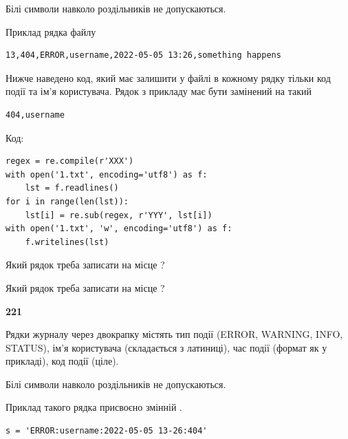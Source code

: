 Білі символи навколо роздільників не допускаються.

Приклад рядка файлу



\begin{verbatim}
13,404,ERROR,username,2022-05-05 13:26,something happens
\end{verbatim}


Нижче наведено код, який має залишити у файлі в кожному рядку тільки код події та ім'я користувача. Рядок з прикладу має бути замінений на такий



\begin{verbatim}
404,username
\end{verbatim}




Код:



\begin{verbatim}
regex = re.compile(r'XXX')
with open('1.txt', encoding='utf8') as f:
    lst = f.readlines()
for i in range(len(lst)):
    lst[i] = re.sub(regex, r'YYY', lst[i])
with open('1.txt', 'w', encoding='utf8') as f:
    f.writelines(lst)
\end{verbatim}







Який рядок треба записати на місце  ?\par
\vspace{5mm}


Який рядок треба записати на місце  ?\par


\newpage

{\begin {center}\textbf{ 221}\end {center}}\par
Рядки журналу через двокрапку містять тип події (ERROR, WARNING, INFO, STATUS), ім'я користувача (складається з латиниці), час події (фор\-мат як у прикладі), код події (ціле).

Білі символи навколо роздільників не допускаються.

Приклад такого рядка присвоєно змінній .



\begin{verbatim}
s = 'ERROR:username:2022-05-05 13-26:404'
\end{verbatim}


